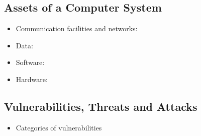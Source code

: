 \documentclass[a4paper]{article}
\theoremstyle{definition}
\theoremstyle{remark}
\begin{document}
	
	\subsection{Assets of a Computer System}
	\begin{itemize}
		\item Communication facilities and networks:
		\item Data:
		\item Software:
		\item Hardware:
	\end{itemize}
	
	
	\subsection{Vulnerabilities, Threats and Attacks}
	\begin{itemize}
		\item Categories of vulnerabilities
	\end{itemize}
\end{document}
